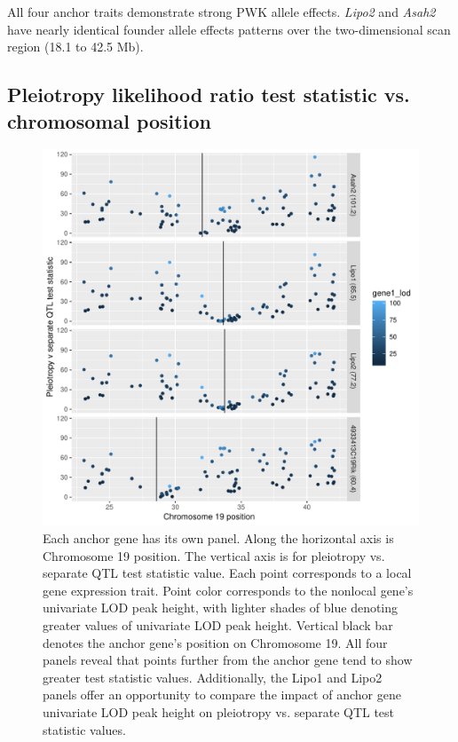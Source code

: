\documentclass{article}
\begin{document}
All four anchor traits demonstrate strong PWK allele effects. \emph{Lipo2} and \emph{Asah2} have nearly identical founder allele effects patterns over the two-dimensional scan region (18.1 to 42.5 Mb). 


\subsection{Pleiotropy likelihood ratio test statistic vs. chromosomal position}

\begin{figure}
    \centering
    \includegraphics[width = \textwidth]{../Rmd/lrt-v-middle-of-gene.pdf}
    \caption{Each anchor gene has its own panel. Along the horizontal axis is Chromosome 19 position. The vertical axis is for pleiotropy vs. separate QTL test statistic value. Each point corresponds to a local gene expression trait. Point color corresponds to the nonlocal gene's univariate LOD peak height, with lighter shades of blue denoting greater values of univariate LOD peak height. Vertical black bar denotes the anchor gene's position on Chromosome 19. All four panels reveal that points further from the anchor gene tend to show greater test statistic values. Additionally, the Lipo1 and Lipo2 panels offer an opportunity to compare the impact of anchor gene univariate LOD peak height on pleiotropy vs. separate QTL test statistic values.}
    \label{fig:middle}
\end{figure}
\end{document}
